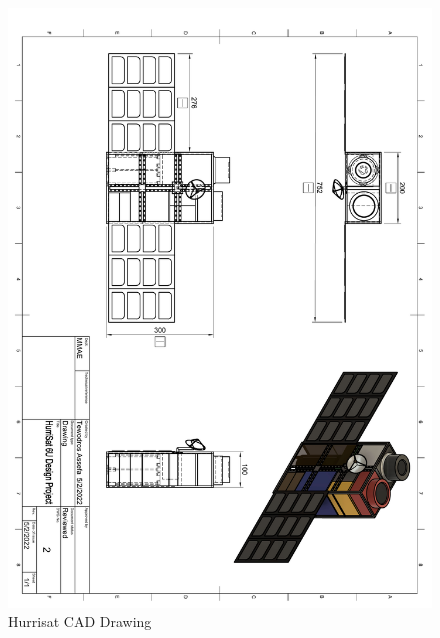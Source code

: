 \begin{figure}
    \centering
    \includegraphics[width=\textwidth, keepaspectratio]{Images/CAD.pdf}
    \caption{Hurrisat CAD Drawing}
    \label{fig:drawing}
\end{figure}

\newpage
